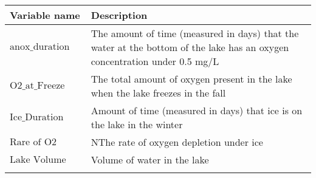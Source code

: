 \documentclass[]{article}
\begin{document}
\begin{longtable}[]{@{}ll@{}}
\toprule
\begin{minipage}[b]{0.19\columnwidth}\raggedright
\textbf{Variable name }\strut
\end{minipage} & \begin{minipage}[b]{0.75\columnwidth}\raggedright
\textbf{Description }\strut
\end{minipage}\tabularnewline
\midrule
\endhead
\begin{minipage}[t]{0.19\columnwidth}\raggedright
\(\text{anox_duration}\)\strut
\end{minipage} & \begin{minipage}[t]{0.75\columnwidth}\raggedright
The amount of time (measured in days) that the water at the bottom of
the lake has an oxygen concentration under 0.5 mg/L\strut
\end{minipage}\tabularnewline
\begin{minipage}[t]{0.19\columnwidth}\raggedright
\(\text{O2_at_Freeze}\)\strut
\end{minipage} & \begin{minipage}[t]{0.75\columnwidth}\raggedright
The total amount of oxygen present in the lake when the lake freezes in
the fall\strut
\end{minipage}\tabularnewline
\begin{minipage}[t]{0.19\columnwidth}\raggedright
\(\text{Ice_Duration}\)\strut
\end{minipage} & \begin{minipage}[t]{0.75\columnwidth}\raggedright
Amount of time (measured in days) that ice is on the lake in the
winter\strut
\end{minipage}\tabularnewline
\begin{minipage}[t]{0.19\columnwidth}\raggedright
\(\text{Rare of O2 Drawdown}\)\strut
\end{minipage} & \begin{minipage}[t]{0.75\columnwidth}\raggedright
NThe rate of oxygen depletion under ice\strut
\end{minipage}\tabularnewline
\begin{minipage}[t]{0.19\columnwidth}\raggedright
\(\text{Lake Volume}\)\strut
\end{minipage} & \begin{minipage}[t]{0.75\columnwidth}\raggedright
Volume of water in the lake\strut
\end{minipage}\tabularnewline
\begin{minipage}[t]{0.19\columnwidth}\raggedright

\end{minipage}
\end{longtable}
\end{document}
